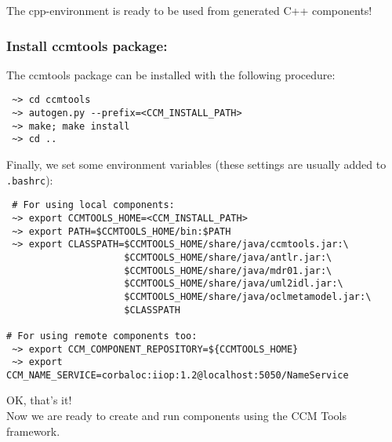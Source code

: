 The cpp-environment is ready to be used from generated C++ components!


\subsubsection{Install ccmtools package:}
The ccmtools package can be installed with the following procedure:
\begin{small}
\begin{verbatim}
 ~> cd ccmtools
 ~> autogen.py --prefix=<CCM_INSTALL_PATH> 
 ~> make; make install   
 ~> cd ..
\end{verbatim}
\end{small}
 
Finally, we set some environment variables (these settings are usually added to 
{\tt .bashrc}):
\begin{small}
\begin{verbatim}
 # For using local components: 
 ~> export CCMTOOLS_HOME=<CCM_INSTALL_PATH>
 ~> export PATH=$CCMTOOLS_HOME/bin:$PATH
 ~> export CLASSPATH=$CCMTOOLS_HOME/share/java/ccmtools.jar:\
                     $CCMTOOLS_HOME/share/java/antlr.jar:\
                     $CCMTOOLS_HOME/share/java/mdr01.jar:\
                     $CCMTOOLS_HOME/share/java/uml2idl.jar:\
                     $CCMTOOLS_HOME/share/java/oclmetamodel.jar:\
                     $CLASSPATH

# For using remote components too:
 ~> export CCM_COMPONENT_REPOSITORY=${CCMTOOLS_HOME}
 ~> export CCM_NAME_SERVICE=corbaloc:iiop:1.2@localhost:5050/NameService
\end{verbatim}
\end{small}

OK, that's it! \\
Now we are ready to create and run components using the CCM Tools framework.

